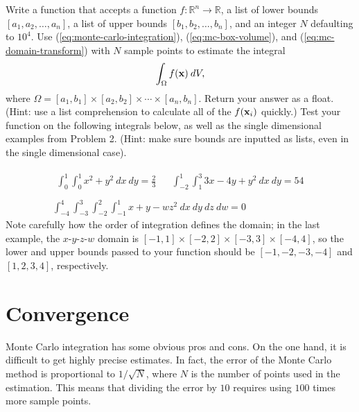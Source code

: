 \begin{problem}
Write a function that accepts a function $f:\mathbb{R}^n\rightarrow\mathbb{R}$, a list of lower bounds $[a_1, a_2, \ldots, a_n]$, a list of upper bounds $[b_1, b_2, \ldots, b_n]$, and an integer $N$ defaulting to $10^4$.
Use (\ref{eq:monte-carlo-integration}), (\ref{eq:mc-box-volume}), and (\ref{eq:mc-domain-transform}) with $N$ sample points to estimate the integral
\[
\int_\Omega f(\mathbf{x})\:dV,
\]
where $\Omega = [a_1,b_1]\times[a_2,b_2]\times\cdots\times[a_n,b_n]$. Return your answer as a float.
\\(Hint: use a list comprehension to calculate all of the $f(\mathbf{x}_i)$ quickly.)
\newline
\newline Test your function on the following integrals below, as well as the single dimensional examples from Problem 2.
\newline (Hint: make sure bounds are inputted as lists, even in the single dimensional case).

\[
\begin{array}{c}
    \begin{array}{ccc}
    \displaystyle\int_0^1\int_0^1 x^2 + y^2\:dx\:dy = \frac{2}{3}
    & &
    \displaystyle\int_{-2}^1\int_1^3 3x - 4y + y^2\:dx\:dy = 54
    \end{array}
\\ \\
\displaystyle\int_{-4}^4\int_{-3}^3\int_{-2}^2\int_{-1}^1 x + y - w z^2\:dx\:dy\:dz\:dw = 0
\end{array}
\]
Note carefully how the order of integration defines the domain; in the last example, the $x$-$y$-$z$-$w$ domain is $[-1,1]\times[-2,2]\times[-3,3]\times[-4,4]$, so the lower and upper bounds passed to your function should be $[-1, -2, -3, -4]$ and $[1, 2, 3, 4]$, respectively.
\label{prob:montecarlo-integration-nd}
\end{problem}

\section*{Convergence} %

Monte Carlo integration has some obvious pros and cons.
On the one hand, it is difficult to get highly precise estimates.
In fact, the error of the Monte Carlo method is proportional to $1/\sqrt{N}$, where $N$ is the number of points used in the estimation.
This means that dividing the error by $10$ requires using $100$ times more sample points.

